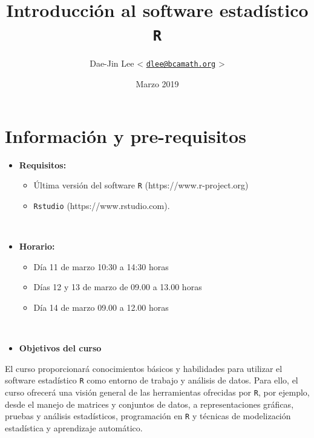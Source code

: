 \documentclass[]{book}
\title{Introducción al software estadístico \texttt{R}}
\author{Dae-Jin Lee \textless{}
\href{mailto:dlee@bcamath.org}{\nolinkurl{dlee@bcamath.org}}
\textgreater{}}
\date{Marzo 2019}
\providecommand{\tightlist}{%
  \setlength{\itemsep}{0pt}\setlength{\parskip}{0pt}}
\begin{document}
\maketitle

{
\setcounter{tocdepth}{1}
\tableofcontents
}
\chapter{Información y
pre-requisitos}\label{informacion-y-pre-requisitos}

\begin{itemize}
\item
  \textbf{Requisitos:}

  \begin{itemize}
  \tightlist
  \item
    Última versión del software \texttt{R} (https://www.r-project.org)
  \item
    \texttt{Rstudio} (https://www.rstudio.com).
  \end{itemize}
\end{itemize}

~

\begin{itemize}
\item
  \textbf{Horario:}

  \begin{itemize}
  \tightlist
  \item
    Día 11 de marzo 10:30 a 14:30 horas
  \item
    Días 12 y 13 de marzo de 09.00 a 13.00 horas
  \item
    Día 14 de marzo 09.00 a 12.00 horas
  \end{itemize}
\end{itemize}

~

\begin{itemize}
\tightlist
\item
  \textbf{Objetivos del curso}
\end{itemize}

El curso proporcionará conocimientos básicos y habilidades para utilizar
el software estadístico \texttt{R} como entorno de trabajo y análisis de
datos. Para ello, el curso ofrecerá una visión general de las
herramientas ofrecidas por \texttt{R}, por ejemplo, desde el manejo de
matrices y conjuntos de datos, a representaciones gráficas, pruebas y
análisis estadísticos, programación en \texttt{R} y técnicas de
modelización estadística y aprendizaje automático.
\end{document}

